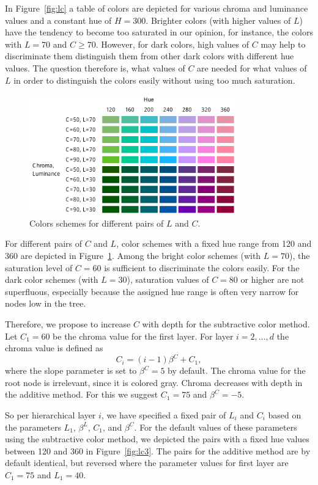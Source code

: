 \documentclass[journal]{vgtc}                %
\begin{document}
In Figure~\ref{fig:lc} a table of colors are depicted for various chroma and luminance values and a constant hue of $H=300$. Brighter colors (with higher values of $L$) have the tendency to become too saturated in our opinion, for instance, the colors with $L=70$ and $C\geq70$. However, for dark colors, high values of $C$ may help to discriminate them distinguish them from other dark colors with different hue values. The question therefore is, what values of $C$ are needed for what values of $L$ in order to distinguish the colors easily without using too much saturation.


\begin{figure}[!b]
  \centering
  \includegraphics[width=3.5in]{LC2.pdf}
  \caption{Colors schemes for different pairs of $L$ and $C$.}\label{fig:lc2}
\end{figure}

For different pairs of $C$ and $L$, color schemes with a fixed hue range from 120 and 360 are depicted in Figure~\ref{fig:lc2}. Among the bright color schemes (with $L=70$), the saturation level of $C=60$ is sufficient to discriminate the colors easily. For the dark color schemes (with $L=30$), saturation values of $C=80$ or higher are not superfluous, especially because the assigned hue range is often very narrow for nodes low in the tree.

Therefore, we propose to increase $C$ with depth for the subtractive color method. Let $C_1=60$ be the chroma value for the first layer. For layer $i=2,\ldots, d$ the chroma value is defined as
\begin{equation}
C_i=(i-1)\beta^C + C_1,
\end{equation}
where the slope parameter is set to $\beta^C=5$ by default. The chroma value for the root node is irrelevant, since it is colored gray. Chroma decreases with depth in the additive method. For this we suggest $C_1=75$ and $\beta^C=-5$.

So per hierarchical layer $i$, we have specified a fixed pair of $L_i$ and $C_i$ based on the parameters $L_1$, $\beta^L$, $C_1$, and $\beta^C$. For the default values of these parameters using the subtractive color method, we depicted the pairs with a fixed hue values between 120 and 360 in Figure~\ref{fig:lc3}. The pairs for the additive method are by default identical, but reversed where the parameter values for first layer are $C_1=75$ and $L_1=40$.
\end{document}
